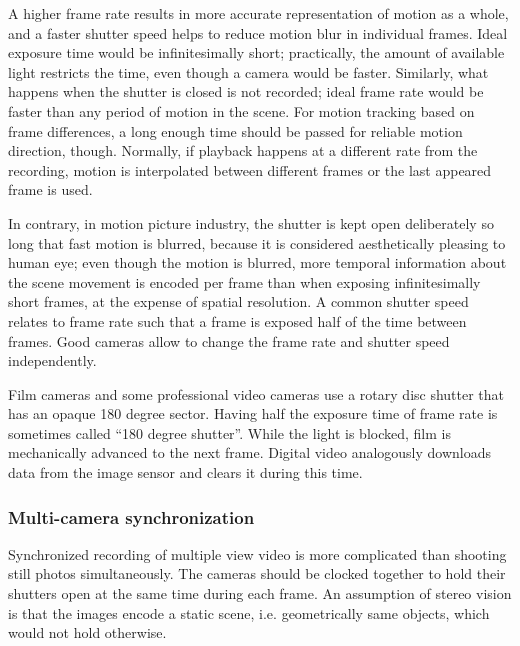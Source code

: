 A higher frame rate results in more accurate representation of motion as a whole, and a faster shutter speed helps to reduce motion blur in individual frames.
Ideal exposure time would be infinitesimally short; practically, the amount of available light restricts the time, even though a camera would be faster.
Similarly, what happens when the shutter is closed is not recorded; ideal frame rate would be faster than any period of motion in the scene.
For motion tracking based on frame differences, a long enough time should be passed for reliable motion direction, though.
Normally, if playback happens at a different rate from the recording, motion is interpolated between different frames or the last appeared frame is used.

In contrary, in motion picture industry, the shutter is kept open deliberately so long that fast motion is blurred, because it is considered aesthetically pleasing to human eye;
even though the motion is blurred, more temporal information about the scene movement is encoded per frame than when exposing infinitesimally short frames, at the expense of spatial resolution.
A common shutter speed relates to frame rate such that a frame is exposed half of the time between frames.
\cite{wilson2004anton}
Good cameras allow to change the frame rate and shutter speed independently.

Film cameras and some professional video cameras use a rotary disc shutter that has an opaque 180 degree sector.
Having half the exposure time of frame rate is sometimes called ``180 degree shutter''.
While the light is blocked, film is mechanically advanced to the next frame.
\cite{wilson2004anton}
Digital video analogously downloads data from the image sensor and clears it during this time.



\subsubsection{Multi-camera synchronization} %


Synchronized recording of multiple view video is more complicated than shooting still photos simultaneously.
The cameras should be clocked together to hold their shutters open at the same time during each frame.
An assumption of stereo vision is that the images encode a static scene, i.e. geometrically same objects, which would not hold otherwise.

